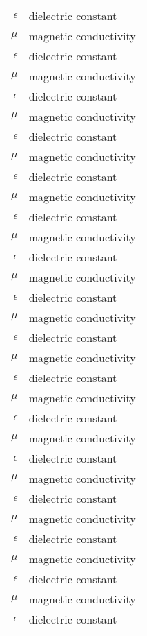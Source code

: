 \begin{nomenclature}

\begin{longtable}{rl}
  $\epsilon$ & dielectric constant   \\
  $\mu$      & magnetic conductivity \\
  $\epsilon$ & dielectric constant   \\
  $\mu$      & magnetic conductivity \\
  $\epsilon$ & dielectric constant   \\
  $\mu$      & magnetic conductivity \\
  $\epsilon$ & dielectric constant   \\
  $\mu$      & magnetic conductivity \\
  $\epsilon$ & dielectric constant   \\
  $\mu$      & magnetic conductivity \\
  $\epsilon$ & dielectric constant   \\
  $\mu$      & magnetic conductivity \\
  $\epsilon$ & dielectric constant   \\
  $\mu$      & magnetic conductivity \\
  $\epsilon$ & dielectric constant   \\
  $\mu$      & magnetic conductivity \\
  $\epsilon$ & dielectric constant   \\
  $\mu$      & magnetic conductivity \\
  $\epsilon$ & dielectric constant   \\
  $\mu$      & magnetic conductivity \\
  $\epsilon$ & dielectric constant   \\
  $\mu$      & magnetic conductivity \\
  $\epsilon$ & dielectric constant   \\
  $\mu$      & magnetic conductivity \\
  $\epsilon$ & dielectric constant   \\
  $\mu$      & magnetic conductivity \\
  $\epsilon$ & dielectric constant   \\
  $\mu$      & magnetic conductivity \\
  $\epsilon$ & dielectric constant   \\
  $\mu$      & magnetic conductivity \\
  $\epsilon$ & dielectric constant   \\

\end{longtable}
\end{nomenclature}
